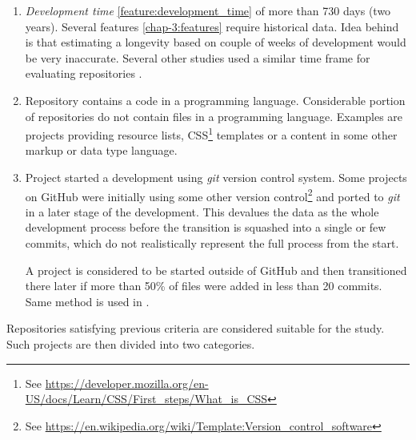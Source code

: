 \begin{enumerate}
    \label{sec:suitable}
    \item \emph{Development time} \ref{feature:development_time} of more than 730 days (two years).
    Several features \ref{chap-3:features} require historical data.
    Idea behind is that estimating a longevity based on couple of weeks of development would be very inaccurate.
    Several other studies used a similar time frame for evaluating repositories \cite{}.

    \item Repository contains a code in a programming language.
    Considerable portion of repositories do not contain files in a programming language.
    Examples are projects providing resource lists, CSS\footnote{See \url{https://developer.mozilla.org/en-US/docs/Learn/CSS/First\_steps/What\_is\_CSS}} templates or a content in some other markup or data type language.

    \item Project started a development using \emph{git} version control system.
    Some projects on GitHub were initially using some other version control\footnote{See \url{https://en.wikipedia.org/wiki/Template:Version\_control\_software}} and ported to \emph{git} in a later stage of the development.
    This devalues the data as the whole development process before the transition is squashed into a single or few commits, which do not realistically represent the full process from the start.

    A project is considered to be started outside of GitHub and then transitioned there later if more than 50\% of files were added in less than 20 commits.
    Same method is used in \cite{p:16}.

\end{enumerate}

Repositories satisfying previous criteria are considered suitable for the study.
Such projects are then divided into two categories.

